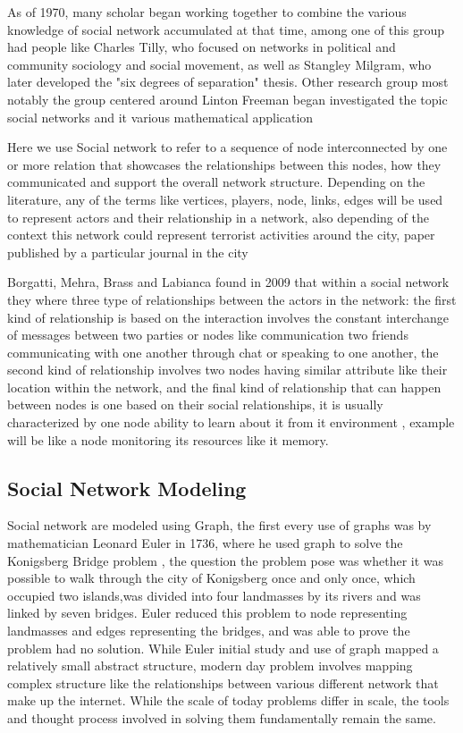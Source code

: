  As of 1970, many scholar began working together to combine the various knowledge of social network accumulated at that time, among one of this group had people like Charles Tilly, who focused on networks in political and community sociology and social movement, as well as Stangley Milgram, who later developed the "six degrees of separation" thesis.  Other research group most notably the group centered around Linton Freeman began investigated the topic social networks and it various mathematical application 

Here we use Social network to refer to a sequence of node interconnected by one or more relation\cite{scott2011social} that showcases the relationships between this nodes, how they communicated and support the overall network structure. Depending on the literature, any of the terms like vertices, players, node, links, edges will be used to represent actors and their relationship in a network, also depending of the context this network could represent terrorist activities around the city, paper published by a particular journal in the city

Borgatti, Mehra, Brass and Labianca \cite{borgattinetwork} found in 2009 that within a social network they where three type of relationships between the actors in the network: the first kind of relationship is based on the interaction involves the constant interchange of messages between two parties or nodes like communication two friends communicating with one another through chat or speaking to one another, the second kind of relationship involves two nodes having similar attribute like their location within the network, and the final kind of relationship that can happen between nodes is one based on their social relationships, it is usually characterized by one node ability to learn about it from it environment , example will be like a node monitoring its resources like it memory. 


\subsection{Social Network Modeling}
Social network are modeled using Graph, the first every use of graphs was by mathematician Leonard Euler in 1736, where he used graph to solve the Konigsberg Bridge problem , the question the problem pose was whether it was possible to walk through the city of Konigsberg\cite{westIntroduction} once and only once, which occupied two islands,was divided into four landmasses by its rivers and was linked by seven bridges. Euler reduced this problem to node representing landmasses and edges representing the bridges, and was able to prove the problem had no solution. 
While  Euler initial study and use of graph mapped a relatively small abstract structure, modern day problem involves mapping complex structure like the relationships between various different network that make up the internet. While the scale of today problems differ in scale, the tools and thought process involved in solving them fundamentally remain the same.

